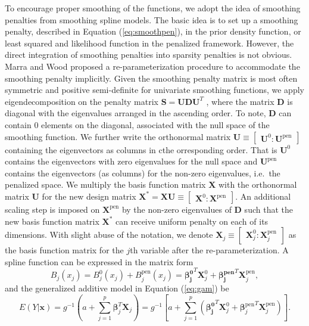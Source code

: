 \documentclass[AMA,STIX1COL,]{WileyNJD-v2}
\begin{document}
To encourage proper smoothing of the functions, we adopt the idea of
smoothing penalties from smoothing spline models. The basic idea is to
set up a smoothing penalty, described in Equation (\ref{eq:smoothpen}),
in the prior density function, or least squared and likelihood function
in the penalized framework. However, the direct integration of smoothing
penalties into sparsity penalties is not obvious. Marra and Wood
\citep{Marra2011} proposed a re-parameterization procedure to
accommodate the smoothing penalty implicitly. Given the smoothing
penalty matrix is most often symmetric and positive semi-definite for
univariate smoothing functions, we apply eigendecomposition on the
penalty matrix
\(\boldsymbol{S} = \boldsymbol{U} \boldsymbol{D} \boldsymbol{U}^T\) ,
where the matrix \(\boldsymbol{D}\) is diagonal with the eigenvalues
arranged in the ascending order. To note, \(\boldsymbol{D}\) can contain
\(0\) elements on the diagonal, associated with the null space of the
smoothing function. We further write the orthonormal matrix
\(\boldsymbol{U} \equiv \begin{bmatrix}\boldsymbol{U}^0 : \boldsymbol{U}^{\text{pen}}\end{bmatrix}\)
containing the eigenvectors as columns in cthe orresponding order. That
is \(\boldsymbol{U}^0\) contains the eigenvectors with zero eigenvalues
for the null space and \(\boldsymbol{U}^{\text{pen}}\) contains the
eigenvectors (as columns) for the non-zero eigenvalues, i.e.~the
penalized space. We multiply the basis function matrix
\(\boldsymbol{X}\) with the orthonormal matrix \(\boldsymbol{U}\) for
the new design matrix
\(\boldsymbol{X}^\ast = \boldsymbol{X} \boldsymbol{U} \equiv \begin{bmatrix} \boldsymbol{X}^0 : \boldsymbol{X}^{\text{pen}} \end{bmatrix}\).
An additional scaling step is imposed on \(\boldsymbol{X}^{\text{pen}}\)
by the non-zero eigenvalues of \(\boldsymbol{D}\) such that the new
basis function matrix \(\boldsymbol{X}^\ast\) can receive uniform
penalty on each of its dimensions. With slight abuse of the notation, we
denote
\(\boldsymbol{X}_j \equiv \begin{bmatrix} \boldsymbol{X}_j^0 : \boldsymbol{X}_j^{\text{pen}} \end{bmatrix}\)
as the basis function matrix for the \(j\)th variable after the
re-parameterization. A spline function can be expressed in the matrix
form \[
B_j(x_j) = B_j^0(x_j) + B_j^\text{pen}(x_j) = \boldsymbol{\beta_j^0}^T \boldsymbol{X}_j^0 + \boldsymbol{\beta_j^\text{pen}}^T \boldsymbol{X}_j^\text{pen},
\] and the generalized additive model in Equation (\ref{eq:gam}) be
\begin{equation}\label{eq:gam-repa}
E(Y|\boldsymbol{x}) =  g^{-1}(a + \sum\limits^p_{j=1} \boldsymbol{\beta}_j^T \boldsymbol{X}_j) = g^{-1}\left[a + \sum\limits^p_{j=1} (\boldsymbol{\beta_j^0}^T \boldsymbol{X}_j^0 + {\boldsymbol{\beta}_j^\text{pen}}^T \boldsymbol{X}_j^\text{pen})\right].
\end{equation}
\end{document}
